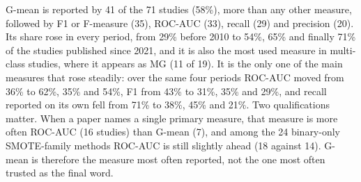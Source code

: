 G-mean is reported by 41 of the 71 studies (58\%), more than any other measure, followed by F1 or F-measure (35), ROC-AUC (33), recall (29) and precision (20). Its share rose in every period, from 29\% before 2010 to 54\%, 65\% and finally 71\% of the studies published since 2021, and it is also the most used measure in multi-class studies, where it appears as MG (11 of 19). It is the only one of the main measures that rose steadily: over the same four periods ROC-AUC moved from 36\% to 62\%, 35\% and 54\%, F1 from 43\% to 31\%, 35\% and 29\%, and recall reported on its own fell from 71\% to 38\%, 45\% and 21\%. Two qualifications matter. When a paper names a single primary measure, that measure is more often ROC-AUC (16 studies) than G-mean (7), and among the 24 binary-only SMOTE-family methods ROC-AUC is still slightly ahead (18 against 14). G-mean is therefore the measure most often reported, not the one most often trusted as the final word.

